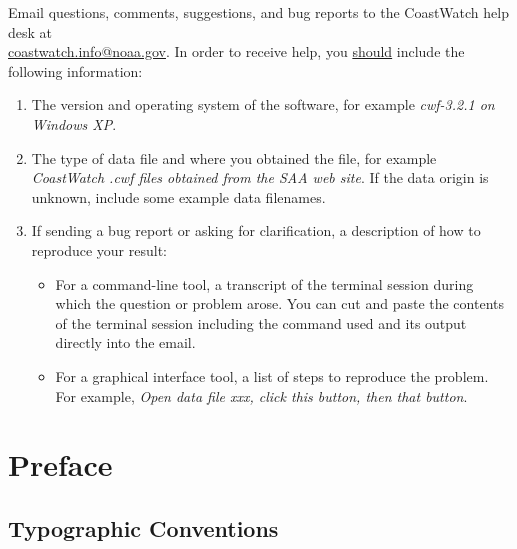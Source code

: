 Email questions, comments, suggestions, and bug reports to the
CoastWatch help desk at \\
\href{mailto:coastwatch.info@noaa.gov}{coastwatch.info@noaa.gov}.
In order to receive help, you \underline{should} include the
following information:
\begin{enumerate}

  \item The version and operating system of the software, for
  example {\em cwf-3.2.1 on Windows XP}.

  \item The type of data file and where you obtained the file,
  for example {\em CoastWatch .cwf files obtained from the SAA web
  site}.  If the data origin is unknown, include some example data
  filenames.

  \item If sending a bug report or asking for clarification, a
  description of how to reproduce your result:
  \begin{itemize}

    \item For a command-line tool, a transcript of the terminal
    session during which the question or problem arose.  You
    can cut and paste the contents
    of the terminal session including the command used and its output
    directly into the email.

    \item For a graphical interface tool, a list of steps to
    reproduce the problem.  For example, {\em
    Open data file xxx, click this button, then that button}.

  \end{itemize}

\end{enumerate}

\newpage

\tableofcontents
\newpage

\listoffigures
\newpage

\setcounter{page}{1}

\chapter*{Preface}

\section*{Typographic Conventions}

